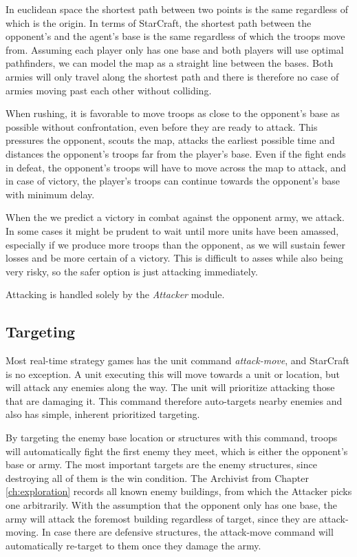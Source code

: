 In euclidean space the shortest path between two points is the same regardless of which is the origin. In terms of StarCraft, the shortest path between the opponent's and the agent's base is the same regardless of which the troops move from. Assuming each player only has one base and both players will use optimal pathfinders, we can model the map as a straight line between the bases. Both armies will only travel along the shortest path and there is therefore no case of armies moving past each other without colliding.

When rushing, it is favorable to move troops as close to the opponent's base as possible without confrontation, even before they are ready to attack. This pressures the opponent, scouts the map, attacks the earliest possible time and distances the opponent's troops far from the player's base. Even if the fight ends in defeat, the opponent's troops will have to move across the map to attack, and in case of victory, the player's troops can continue towards the opponent's base with minimum delay.

When the we predict a victory in combat against the opponent army, we attack. In some cases it might be prudent to wait until more units have been amassed, especially if we produce more troops than the opponent, as we will sustain fewer losses and be more certain of a victory. This is difficult to asses while also being very risky, so the safer option is just attacking immediately.

Attacking is handled solely by the \emph{Attacker} module.

	\subsection*{Targeting}
	Most real-time strategy games has the unit command \emph{attack-move}, and StarCraft is no exception. A unit executing this will move towards a unit or location, but will attack any enemies along the way. The unit will prioritize attacking those that are damaging it. This command therefore auto-targets nearby enemies and also has simple, inherent prioritized targeting.
	
	By targeting the enemy base location or structures with this command, troops will automatically fight the first enemy they meet, which is either the opponent's base or army. The most important targets are the enemy structures, since destroying all of them is the win condition. The Archivist from Chapter \ref{ch:exploration} records all known enemy buildings, from which the Attacker picks one arbitrarily. With the assumption that the opponent only has one base, the army will attack the foremost building regardless of target, since they are attack-moving. In case there are defensive structures, the attack-move command will automatically re-target to them once they damage the army.
	
